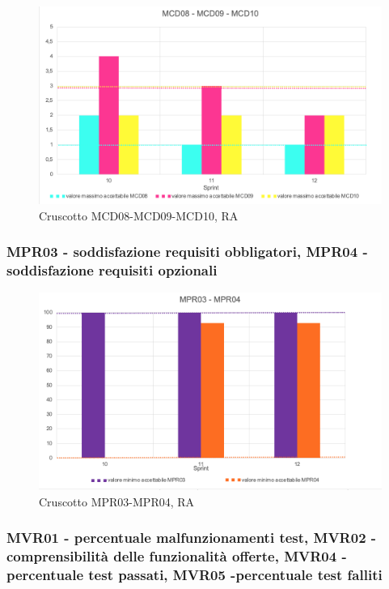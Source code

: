 \begin{figure}[H] 
    \centering
    \includegraphics[scale = 0.8]{immagini/ImmRA/MCD080910.png}
    \caption{Cruscotto MCD08-MCD09-MCD10, RA}
\end{figure}

\subsubsection*{MPR03 - soddisfazione requisiti obbligatori, MPR04 - soddisfazione requisiti opzionali }

\begin{figure}[H] 
    \centering
    \includegraphics[scale = 0.8]{immagini/ImmRA/MPR0304.png}
    \caption{Cruscotto MPR03-MPR04, RA}
\end{figure}

\subsubsection*{MVR01 - percentuale malfunzionamenti test, MVR02 - comprensibilità delle funzionalità offerte, MVR04 -percentuale test passati, MVR05 -percentuale test falliti }

